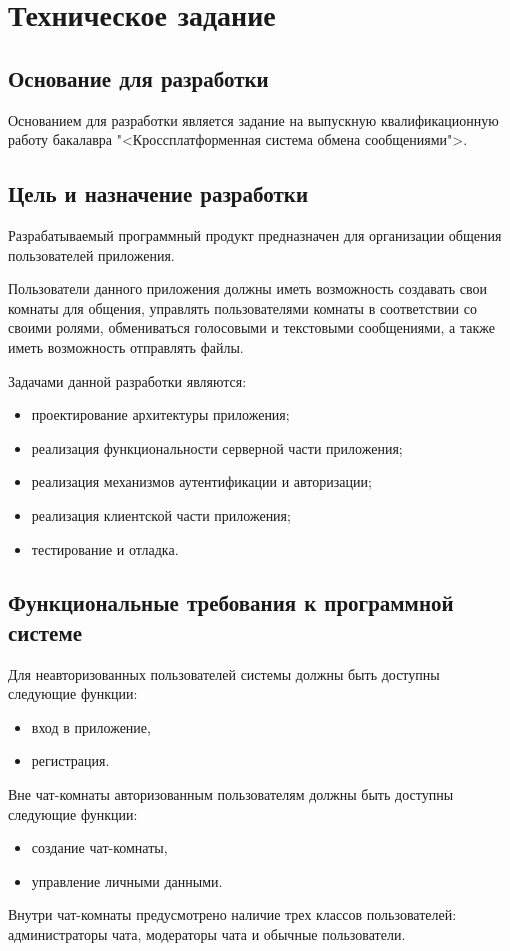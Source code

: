 \section{Техническое задание}
\subsection{Основание для разработки}

Основанием для разработки является задание на выпускную квалификационную работу бакалавра "<Кроссплатформенная система обмена сообщениями">.

\subsection{Цель и назначение разработки}

Разрабатываемый программный продукт предназначен для организации общения пользователей приложения.

Пользователи данного приложения должны иметь возможность создавать свои комнаты для общения, управлять пользователями комнаты в соответствии со своими ролями, обмениваться голосовыми и текстовыми сообщениями, а также иметь возможность отправлять файлы.

Задачами данной разработки являются:
\begin{itemize}
\item проектирование архитектуры приложения;
\item реализация функциональности серверной части приложения;
\item реализация механизмов аутентификации и авторизации;
\item реализация клиентской части приложения;
\item тестирование и отладка.
\end{itemize}


\subsection{Функциональные требования к программной системе}

Для неавторизованных пользователей системы должны быть доступны следующие функции:

\begin{itemize}
	\item вход в приложение,
	\item регистрация.
\end{itemize}

Вне чат-комнаты авторизованным пользователям должны быть доступны следующие функции:
\begin{itemize}
	\item создание чат-комнаты,
	\item управление личными данными.
\end{itemize}
Внутри чат-комнаты предусмотрено наличие трех классов пользователей: администраторы чата, модераторы чата и обычные пользователи.

